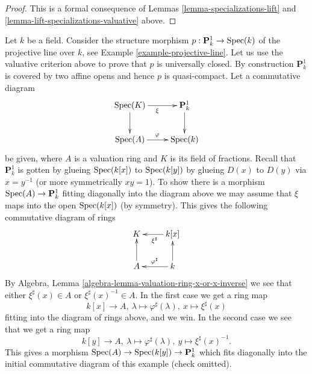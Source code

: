 \begin{proof}
This is a formal consequence of
Lemmas \ref{lemma-specializations-lift} and
\ref{lemma-lift-specializations-valuative} above.
\end{proof}

\begin{example}
\label{example-projective-line-universally-closed}
Let $k$ be a field. Consider the structure morphism
$p : \mathbf{P}^1_k \to \mathop{\rm Spec}(k)$ of the projective
line over $k$, see Example \ref{example-projective-line}.
Let us use the valuative criterion above to prove that $p$
is universally closed.
By construction $\mathbf{P}^1_k$ is covered by two
affine opens and hence $p$ is quasi-compact.
Let a commutative diagram
$$
\xymatrix{
\Spec(K) \ar[r]_\xi \ar[d] & \mathbf{P}^1_k \ar[d] \\
\Spec(A) \ar[r]^\varphi & \Spec(k)
}
$$
be given, where $A$ is a valuation ring and $K$ is its field
of fractions. Recall that $\mathbf{P}^1_k$ is gotten by glueing
$\mathop{\rm Spec}(k[x])$ to $\mathop{\rm Spec}(k[y])$ by glueing
$D(x)$ to $D(y)$ via $x = y^{-1}$ (or more symmetrically $xy = 1$).
To show there is a morphism $\mathop{\rm Spec}(A) \to \mathbf{P}^1_k$
fitting diagonally into the diagram above we may assume that $\xi$
maps into the open $\mathop{\rm Spec}(k[x])$ (by symmetry). This gives the following
commutative diagram of rings
$$
\xymatrix{
K & \ar[l]^{\xi^\sharp} k[x] \\
A \ar[u] & k \ar[u] \ar[l]_{\varphi^\sharp}
}
$$
By Algebra, Lemma \ref{algebra-lemma-valuation-ring-x-or-x-inverse}
we see that either
$\xi^\sharp(x) \in A$ or $\xi^\sharp(x)^{-1} \in A$.
In the first case we get a ring map
$$
k[x] \to A,
\ \lambda \mapsto \varphi^\sharp(\lambda),
\  x \mapsto \xi^\sharp(x)
$$
fitting into the diagram of rings above, and we win.
In the second case we see that we get a ring map
$$
k[y] \to A,
\ \lambda \mapsto \varphi^\sharp(\lambda),
\ y \mapsto \xi^\sharp(x)^{-1}.
$$
This gives a morphism
$\mathop{\rm Spec}(A) \to \mathop{\rm Spec}(k[y]) \to \mathbf{P}^1_k$
which fits diagonally into the initial commutative diagram of this example
(check omitted).
\end{example}






























